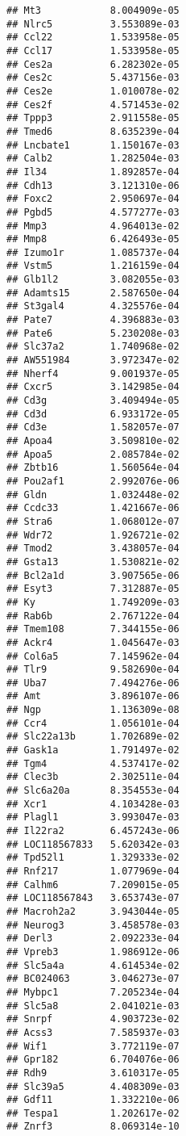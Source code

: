 \documentclass[
]{article}
\begin{document}
\begin{verbatim}
## Mt3            8.004909e-05
## Nlrc5          3.553089e-03
## Ccl22          1.533958e-05
## Ccl17          1.533958e-05
## Ces2a          6.282302e-05
## Ces2c          5.437156e-03
## Ces2e          1.010078e-02
## Ces2f          4.571453e-02
## Tppp3          2.911558e-05
## Tmed6          8.635239e-04
## Lncbate1       1.150167e-03
## Calb2          1.282504e-03
## Il34           1.892857e-04
## Cdh13          3.121310e-06
## Foxc2          2.950697e-04
## Pgbd5          4.577277e-03
## Mmp3           4.964013e-02
## Mmp8           6.426493e-05
## Izumo1r        1.085737e-04
## Vstm5          1.216159e-04
## Glb1l2         3.082055e-03
## Adamts15       2.587650e-04
## St3gal4        4.325576e-04
## Pate7          4.396883e-03
## Pate6          5.230208e-03
## Slc37a2        1.740968e-02
## AW551984       3.972347e-02
## Nherf4         9.001937e-05
## Cxcr5          3.142985e-04
## Cd3g           3.409494e-05
## Cd3d           6.933172e-05
## Cd3e           1.582057e-07
## Apoa4          3.509810e-02
## Apoa5          2.085784e-02
## Zbtb16         1.560564e-04
## Pou2af1        2.992076e-06
## Gldn           1.032448e-02
## Ccdc33         1.421667e-06
## Stra6          1.068012e-07
## Wdr72          1.926721e-02
## Tmod2          3.438057e-04
## Gsta13         1.530821e-02
## Bcl2a1d        3.907565e-06
## Esyt3          7.312887e-05
## Ky             1.749209e-03
## Rab6b          2.767122e-04
## Tmem108        7.344155e-06
## Ackr4          1.045647e-03
## Col6a5         7.145962e-04
## Tlr9           9.582690e-04
## Uba7           7.494276e-06
## Amt            3.896107e-06
## Ngp            1.136309e-08
## Ccr4           1.056101e-04
## Slc22a13b      1.702689e-02
## Gask1a         1.791497e-02
## Tgm4           4.537417e-02
## Clec3b         2.302511e-04
## Slc6a20a       8.354553e-04
## Xcr1           4.103428e-03
## Plagl1         3.993047e-03
## Il22ra2        6.457243e-06
## LOC118567833   5.620342e-03
## Tpd52l1        1.329333e-02
## Rnf217         1.077969e-04
## Calhm6         7.209015e-05
## LOC118567843   3.653743e-07
## Macroh2a2      3.943044e-05
## Neurog3        3.458578e-03
## Derl3          2.092233e-04
## Vpreb3         1.986912e-06
## Slc5a4a        4.614534e-02
## BC024063       3.046273e-07
## Mybpc1         7.205234e-04
## Slc5a8         2.041021e-03
## Snrpf          4.903723e-02
## Acss3          7.585937e-03
## Wif1           3.772119e-07
## Gpr182         6.704076e-06
## Rdh9           3.610317e-05
## Slc39a5        4.408309e-03
## Gdf11          1.332210e-06
## Tespa1         1.202617e-02
## Znrf3          8.069314e-10

\end{verbatim}
\end{document}
